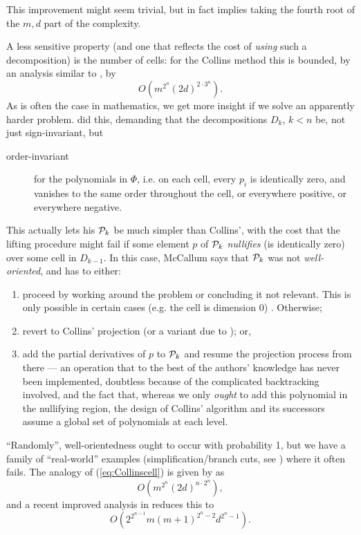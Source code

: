 \documentclass[runningheads,a4paper]{llncs}
\begin{document}
This improvement might seem trivial, but in fact implies taking the fourth root of the $m,d$ part of the complexity. 
\par
A less sensitive property (and one that reflects the cost of \emph{using} such a decomposition) is the number of cells: for the Collins method this is bounded, by an analysis similar to \cite{Bradfordetal2014a}, by
\begin{equation}\label{eq:Collinscell}
O\left(m^{2^{n}}(2d)^{2\cdot3^{n}}\right).
\end{equation}
As is often the case in mathematics, we get more insight if we solve an apparently harder problem. \cite{McCallum1984} did this, demanding that the decompositions $D_k$, $k<n$ be, not just sign-invariant, but 
\begin{description}
\item[order-invariant] for the polynomials in $\Phi$, i.e. on each cell, every $p_i$ is identically zero, and vanishes to the same order throughout the cell, or everywhere positive, or everywhere negative.
\end{description}
This actually lets his ${\cal P}_k$ be much simpler than Collins', with the cost that the lifting procedure might fail if some element $p$ of ${\cal P}_k$ \emph{nullifies} (is identically zero) over some cell in $D_{k-1}$.  In this case, McCallum says that ${\cal P}_k$ was not \emph{well-oriented}, and has to either:
\begin{enumerate}
\item proceed by working around the problem or concluding it not relevant.  This is only possible in certain cases (e.g. the cell is dimension 0) \cite{Brown2005}.  Otherwise;
\item revert to Collins' projection (or a variant due to \cite{Hong1990b}); or,
\item add the partial derivatives of $p$ to ${\cal P}_k$ and resume the projection process from there --- an operation that to the best of the authors' knowledge has never been implemented, doubtless because of the complicated backtracking involved, and the fact that, whereas we only \emph{ought} to add this polynomial in the nullifying region, the design of Collins' algorithm and its successors assume a global set of polynomials at each level.
\end{enumerate}
``Randomly'', well-orientedness ought to occur with probability 1,
but we have a family of ``real-world'' examples (simplification/branch cuts, see \cite{Beaumontetal2007}) where it often fails.
The analogy of (\ref{eq:Collinscell}) is given by \cite[Theorem 6.1.5]{McCallum1985b} as 
\begin{equation}\label{eq:McCcell}
O\left(m^{2^{n}}(2d)^{n\cdot2^{n}}\right),
\end{equation}
and a recent improved analysis in \cite[(12)]{Bradfordetal2014a} reduces this to
\begin{equation}\label{eq:McCcell-us}
O\left(2^{2^{n-1}}m(m+1)^{2^{n}-2}d^{2^{n}-1}\right).
\end{equation}
\end{document}

